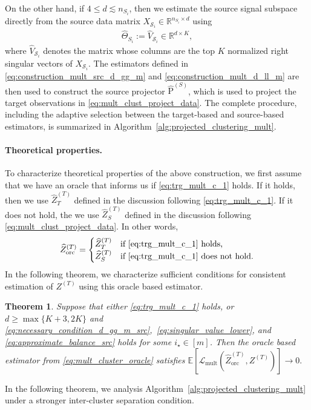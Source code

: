 \documentclass[10pt]{article}
\newtheorem{theorem}{Theorem}
\newcommand{\R}{\mathbb R}
\newcommand{\wh}{\widehat}
\newcommand{\trg}{T}
\newcommand{\Ztar}{Z^{(\trg)}}
\newcommand{\hatZtar}{\wh{Z}^{(\trg)}}
\newcommand{\calS}{\mathcal S}
\newcommand{\src}{S}
\newcommand{\nSm}[1]{n_{\src_{#1}}}
\newcommand{\hatThetaS}[1]{\wh{\Theta}_{S_{#1}}}
\newcommand{\Pest}{\wh{\mathrm P}}
\begin{document}
On the other hand, if 
$4\le d\lesssim \nSm{i}$, then we estimate the source signal subspace directly from the source data matrix $X_{\calS_i}\in\R^{\nSm{i}\times d}$ using
\begin{align}
\label{eq:construction_mult_d_ll_m}
    \hatThetaS{i}:=\wh V_{\calS_i}\in\R^{d\times K},
\end{align}
where $\wh V_{\calS_i}$ denotes the matrix whose columns are the top $K$ normalized right singular vectors of $X_{\calS_i}$. The estimators defined in \eqref{eq:construction_mult_src_d_gg_m} and \eqref{eq:construction_mult_d_ll_m} are then used to construct the source projector $\Pest^{(\src)}$, which is used to
project the target observations in \eqref{eq:mult_clust_project_data}. The complete procedure, including the adaptive selection between the target-based
and source-based estimators, is summarized in Algorithm~\ref{alg:projected_clustering_mult}.

\paragraph{Theoretical properties.}
To characterize theoretical properties of the above construction, we first assume that we have an oracle that informs us if \eqref{eq:trg_mult_c_1} holds. If it holds, then we use $\hatZtar_T$ defined in the discussion following \eqref{eq:trg_mult_c_1}. If it does not hold, the we use $\hatZtar_S$ defined in the discussion following \eqref{eq:mult_clust_project_data}. In other words,
\begin{align}
    \label{eq:mult_cluster_oracle}
    \hatZtar_{\mathrm{orc}}=\begin{cases}
        \hatZtar_T & \mbox{if \eqref{eq:trg_mult_c_1} holds,}\\
        \hatZtar_S & \mbox{if \eqref{eq:trg_mult_c_1} does not hold.}
    \end{cases}
\end{align}
In the following theorem, we characterize sufficient conditions for consistent
estimation of $\Ztar$ using this oracle based estimator. 

\begin{theorem}
\label{thm:consistency_mult_clust_final}
Suppose that either \eqref{eq:trg_mult_c_1} holds,
or $d \ge \max\{K+3,2K\}$ and \eqref{eq:necessary_condition_d_gg_m_src},~\eqref{eq:singular_value_lower}, and \eqref{eq:approximate_balance_src} holds for some $i_\star \in [m]$.
Then the oracle based estimator from \eqref{eq:mult_cluster_oracle} satisfies
$\mathbb E\left[\mathcal L_{\mathrm{mult}}(\hatZtar_{\mathrm{orc}},\Ztar)\right]\to 0.$
\end{theorem}
In the following theorem, we analysis Algorithm~\ref{alg:projected_clustering_mult} under a stronger inter-cluster separation condition.
\end{document}
